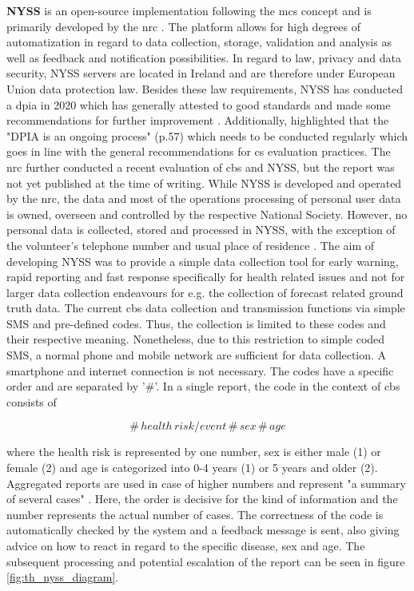 \textbf{NYSS} is an open-source implementation following the \acrshort{mcs} concept and is primarily developed by the \acrshort{nrc} \autocite{jungCommunityBasedSurveillance2022}. The platform allows for high degrees of automatization in regard to data collection, storage, validation and analysis as well as feedback and notification possibilities.\newline
In regard to law, privacy and data security, NYSS servers are located in Ireland and are therefore under European Union data protection law. Besides these law requirements, NYSS has conducted a \acrfull{dpia} in 2020 which has generally attested to good standards and made some recommendations for further improvement \autocite{quinnNyssDataProtection2020}. Additionally, \textcite{quinnNyssDataProtection2020} highlighted that the "DPIA is an ongoing process" (p.57) which needs to be conducted regularly which goes in line with the general recommendations for \acrshort{cs} evaluation practices. The \acrshort{nrc} further conducted a recent evaluation of \acrshort{cbs} and NYSS, but the report was not yet published at the time of writing.\newline
While NYSS is developed and operated by the \acrshort{nrc}, the data and most of the operations processing of personal user data is owned, overseen and controlled by the respective National Society. However, no personal data is collected, stored and processed in NYSS, with the exception of the volunteer's telephone number and usual place of residence \autocite{nrcNYSSCommunitybasedSurveillance2021}.\newline
The aim of developing NYSS was to provide a simple data collection tool for early warning, rapid reporting and fast response specifically for health related issues and not for larger data collection endeavours for e.g. the collection of forecast related ground truth data. The current \acrshort{cbs} data collection and transmission functions via simple SMS and pre-defined codes. Thus, the collection is limited to these codes and their respective meaning. Nonetheless, due to this restriction to simple coded SMS, a normal phone and mobile network are sufficient for data collection. A smartphone and internet connection is not necessary. The codes have a specific order and are separated by '\#'. In a single report, the code in the context of \acrshort{cbs} consists of 

    \[\#\,health\, risk/event\, \#\, sex\, \#\, age\]

where the health risk is represented by one number, sex is either male (1) or female (2) and age is categorized into 0-4 years (1) or 5 years and older (2). Aggregated reports are used in case of higher numbers and represent "a summary of several cases" \autocite[35]{nrcNYSSCommunitybasedSurveillance2021}. Here, the order is decisive for the kind of information and the number represents the actual number of cases. The correctness of the code is automatically checked by the system and a feedback message is sent, also giving advice on how to react in regard to the specific disease, sex and age. The subsequent processing and potential escalation of the report can be seen in figure \ref{fig:th_nyss_diagram}.

